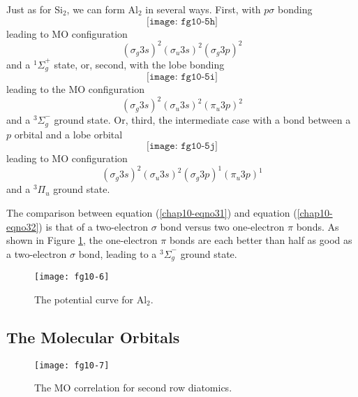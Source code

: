 Just as for Si$_2$, we can form Al$_2$ in several ways.  First, with 
$p \sigma$ bonding
\begin{equation}
\texttt{[image: fg10-5h]}
\label{chap10-eqno31}
\end{equation}
leading to MO configuration
\begin{equation}
\left( \sigma_g 3s \right)^2 \left( \sigma_u 3s \right)^2 \left( 
\sigma_g 3p \right)^2
\end{equation}
and a ${^1\Sigma}^+_g$ state, or, second, with the lobe bonding
\begin{equation}
\texttt{[image: fg10-5i]}
\label{chap10-eqno32}
\end{equation}
leading to the MO configuration
\begin{equation}
\left( \sigma_g 3s \right)^2 \left( \sigma_u 3s \right)^2 \left( 
\pi_u 3p \right)^2 
\end{equation}
and a ${^3\Sigma}^-_g$ ground state.  Or, third,
the intermediate case with a bond between a $p$ orbital and a lobe orbital
\begin{equation}
\texttt{[image: fg10-5j]}
\end{equation}
leading to MO configuration
\begin{equation}
\left( \sigma_g 3s \right)^2 \left( \sigma_u 3s \right)^2 \left( 
\sigma_g 3p \right)^1 \left( \pi_u 3p \right)^1
\end{equation}
and a ${^3\Pi}_u$ ground state.

The comparison between equation (\ref{chap10-eqno31}) and equation
(\ref{chap10-eqno32}) is that of a two-electron $\sigma$ bond versus
two one-electron $\pi$ bonds. As shown in Figure
\ref{chap10-fig6}, 
the one-electron $\pi$ bonds are each better than  half as good as a 
two-electron $\sigma$ bond,
leading to a ${^3\Sigma}^-_g$ ground state.

\begin{figure}
\begin{center}
\texttt{[image: fg10-6]}
\end{center}
\caption{The potential curve for Al$_2$.}
\label{chap10-fig6}
\end{figure}

\subsection{The Molecular Orbitals}

\begin{figure}
\texttt{[image: fg10-7]}
\caption{The MO correlation for second row diatomics.}
\label{chap10-fig7}
\end{figure}

